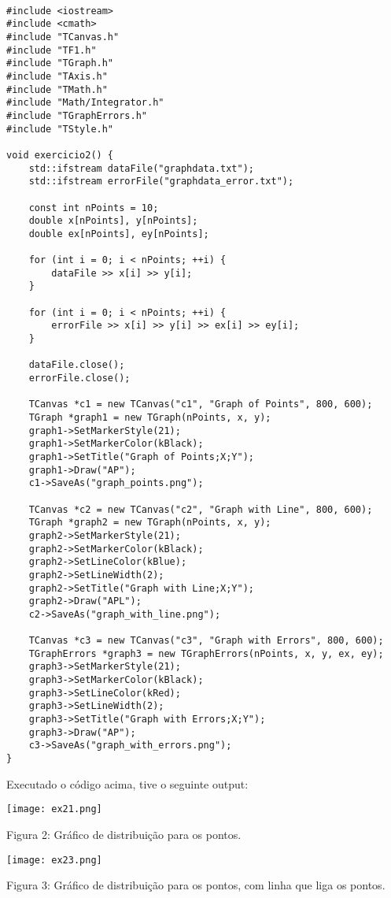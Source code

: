 \documentclass[a4 paper]{article}
\numberwithin{equation}{section}
\newcommand{\0}{\mathbf{0}}
\begin{document}
\begin{lstlisting}

#include <iostream>
#include <cmath>
#include "TCanvas.h"
#include "TF1.h"
#include "TGraph.h"
#include "TAxis.h"
#include "TMath.h"
#include "Math/Integrator.h"
#include "TGraphErrors.h"
#include "TStyle.h"

void exercicio2() {
	std::ifstream dataFile("graphdata.txt");
	std::ifstream errorFile("graphdata_error.txt");

	const int nPoints = 10;
	double x[nPoints], y[nPoints];
	double ex[nPoints], ey[nPoints];

	for (int i = 0; i < nPoints; ++i) {
		dataFile >> x[i] >> y[i];
	}

	for (int i = 0; i < nPoints; ++i) {
		errorFile >> x[i] >> y[i] >> ex[i] >> ey[i];
	}

	dataFile.close();
	errorFile.close();

	TCanvas *c1 = new TCanvas("c1", "Graph of Points", 800, 600);
	TGraph *graph1 = new TGraph(nPoints, x, y);
	graph1->SetMarkerStyle(21);
	graph1->SetMarkerColor(kBlack);
	graph1->SetTitle("Graph of Points;X;Y");
	graph1->Draw("AP");
	c1->SaveAs("graph_points.png");

	TCanvas *c2 = new TCanvas("c2", "Graph with Line", 800, 600);
	TGraph *graph2 = new TGraph(nPoints, x, y);
	graph2->SetMarkerStyle(21);
	graph2->SetMarkerColor(kBlack);
	graph2->SetLineColor(kBlue);
	graph2->SetLineWidth(2);
	graph2->SetTitle("Graph with Line;X;Y");
	graph2->Draw("APL");
	c2->SaveAs("graph_with_line.png");

	TCanvas *c3 = new TCanvas("c3", "Graph with Errors", 800, 600);
	TGraphErrors *graph3 = new TGraphErrors(nPoints, x, y, ex, ey);
	graph3->SetMarkerStyle(21);
	graph3->SetMarkerColor(kBlack);
	graph3->SetLineColor(kRed);
	graph3->SetLineWidth(2);
	graph3->SetTitle("Graph with Errors;X;Y");
	graph3->Draw("AP");
	c3->SaveAs("graph_with_errors.png");
}

\end{lstlisting}

Executado o código acima, tive o seguinte output:

\texttt{[image: ex21.png]}
\begin{center}
    Figura 2: Gráfico de distribuição para os pontos.
\end{center}

\texttt{[image: ex23.png]}
\begin{center}
    Figura 3: Gráfico de distribuição para os pontos, com linha que liga os pontos.
\end{center}
\end{document}

